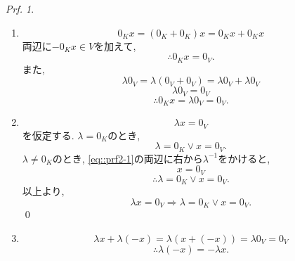 \documentclass[a4paper,10pt,report]{amsart}
\theoremstyle{plain}
\theoremstyle{definition}
\theoremstyle{remark}
\newtheorem{prf}{Prf.}
\begin{document}
\begin{prf}
    \begin{enumerate}
        \item 
        \begin{equation*}
            0_{K}x=(0_{K}+0_{K})x=0_{K}x+0_{K}x
        \end{equation*}
        両辺に\(-0_{K}x\in V\)を加えて, 
        \begin{equation*}
            \therefore 0_{K}x=0_{V}.
        \end{equation*}
        また, 
        \begin{equation*}
            \lambda 0_{V}=\lambda(0_{V}+0_{V})=\lambda0_{V}+\lambda0_{V}
        \end{equation*}
        \begin{equation*}
            \lambda0_{V}=0_{V}
        \end{equation*}
        \begin{equation*}
            \therefore 0_{K}x=\lambda 0_{V}=0_{V}.
        \end{equation*}
        \item 
        \begin{equation}\label{eq::prf2-1}
            \lambda x=0_{V}
        \end{equation}
        を仮定する. \(\lambda=0_{K}\)のとき, 
        \begin{equation*}
            \lambda=0_{K}\vee x=0_{V}.
        \end{equation*}
        \(\lambda\neq0_{K}\)のとき, \cref{eq::prf2-1}の両辺に右から\(\lambda^{-1}\)をかけると, 
        \begin{equation*}
            x=0_{V}
        \end{equation*}
        \begin{equation*}
            \therefore \lambda=0_{K}\vee x=0_{V}.
        \end{equation*}
        以上より, 
        \begin{equation*}
            \lambda x=0_{V}\Rightarrow \lambda=0_{K}\vee x=0_{V}. 
        \end{equation*}
        \qed{}
        \item 
        \begin{equation*}
            \lambda x+\lambda(-x)=\lambda(x+(-x))=\lambda0_{V}=0_{V}
        \end{equation*}
        \begin{equation*}
            \therefore \lambda(-x)=-\lambda x.
        \end{equation*}

\end{enumerate}
\end{prf}
\end{document}
